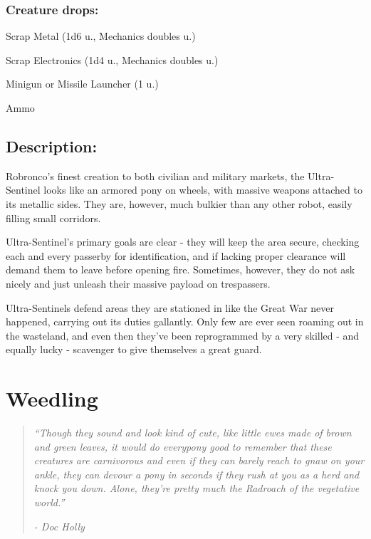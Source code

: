 \documentclass[11pt,a4paper,twocolumn]{book}
\begin{document}
	\subsubsection*{Creature drops:}
	\begin{compactitem}
		\item Scrap Metal (1d6 u., Mechanics doubles u.)
		\item Scrap Electronics (1d4 u., Mechanics doubles u.)
		\item Minigun or Missile Launcher (1 u.)
		\item Ammo
	\end{compactitem}
	
	\subsection*{Description:}
	Robronco's finest creation to both civilian and military markets, the Ultra-Sentinel looks like an armored pony on wheels, with massive weapons attached to its metallic sides. They are, however, much bulkier than any other robot, easily filling small corridors.
	
	Ultra-Sentinel's primary goals are clear - they will keep the area secure, checking each and every passerby for identification, and if lacking proper clearance will demand them to leave before opening fire. Sometimes, however, they do not ask nicely and just unleash their massive payload on trespassers. 
	
	Ultra-Sentinels defend areas they are stationed in like the Great War never happened, carrying out its duties gallantly. Only few are ever seen roaming out in the wasteland, and even then they've been reprogrammed by a very skilled - and equally lucky - scavenger to give themselves a great guard.
	
	\clearpage
	
	\section*{Weedling}
	\begin{quote}
		\emph{``Though they sound and look kind of cute, like little ewes made of brown and green leaves, it would do everypony good to remember that these creatures are carnivorous and even if they can barely reach to gnaw on your ankle, they can devour a pony in seconds if they rush at you as a herd and knock you down. Alone, they're pretty much the Radroach of the vegetative world.'' }
		
		\emph{-	Doc Holly}
	\end{quote}
	
\end{document}
